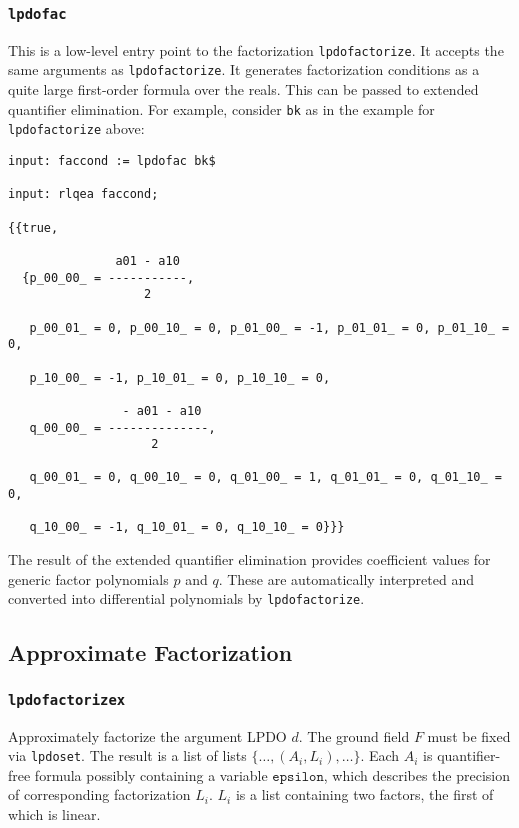 \documentclass[a4paper]{article}
\begin{document}
\subsubsection{\texttt{lpdofac}}
This is a low-level entry point to the factorization
\texttt{lpdofactorize}. It accepts the same arguments as
\texttt{lpdofactorize}. It generates factorization conditions as a quite
large first-order formula over the reals. This can be passed to extended
quantifier elimination. For example, consider \texttt{bk} as in the
example for \texttt{lpdofactorize} above:

{\samepage
\begin{footnotesize}
\begin{verbatim}
input: faccond := lpdofac bk$

input: rlqea faccond;

{{true,

               a01 - a10
  {p_00_00_ = -----------,
                   2

   p_00_01_ = 0, p_00_10_ = 0, p_01_00_ = -1, p_01_01_ = 0, p_01_10_ = 0,

   p_10_00_ = -1, p_10_01_ = 0, p_10_10_ = 0,

                - a01 - a10
   q_00_00_ = --------------,
                    2

   q_00_01_ = 0, q_00_10_ = 0, q_01_00_ = 1, q_01_01_ = 0, q_01_10_ = 0,

   q_10_00_ = -1, q_10_01_ = 0, q_10_10_ = 0}}}
\end{verbatim}
\end{footnotesize}
}
The result of the extended quantifier elimination provides coefficient
values for generic factor polynomials $p$ and $q$. These are
automatically interpreted and converted into differential polynomials
by \texttt{lpdofactorize}.

\subsection{Approximate Factorization}

\subsubsection{\texttt{lpdofactorizex}}
Approximately factorize the argument LPDO $d$. The ground field $F$ must
be fixed via \texttt{lpdoset}. The result is a list of lists
$\{\dots,(A_i,L_i),\dots\}$. Each $A_i$ is quantifier-free formula
possibly containing a variable $\texttt{epsilon}$, which describes the
precision of corresponding factorization $L_i$. $L_i$ is a list
containing two factors, the first of which is linear.
\end{document}
